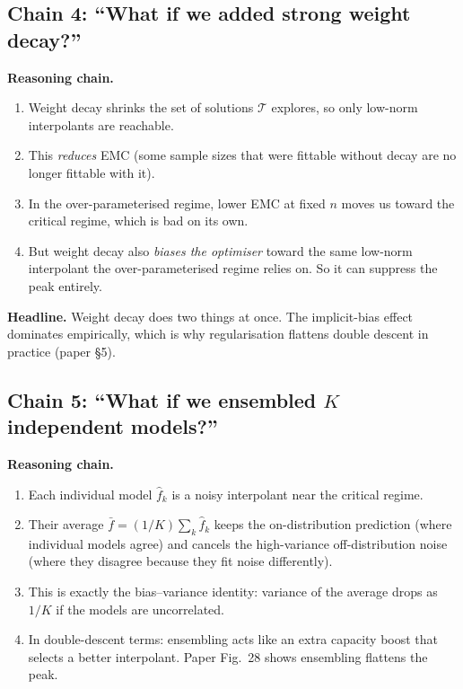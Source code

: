\documentclass[11pt,a4paper]{article}
\newcommand{\T}{\mathcal{T}}
\theoremstyle{definition}
\begin{document}
\subsection{Chain 4: ``What if we added strong weight decay?''}

\textbf{Reasoning chain.}
\begin{enumerate}[leftmargin=1.4em]
\item Weight decay shrinks the set of solutions $\T$ explores, so only low-norm interpolants are reachable.
\item This \emph{reduces} EMC (some sample sizes that were fittable without decay are no longer fittable with it).
\item In the over-parameterised regime, lower EMC at fixed $n$ moves us toward the critical regime, which is bad on its own.
\item But weight decay also \emph{biases the optimiser} toward the same low-norm interpolant the over-parameterised regime relies on. So it can suppress the peak entirely.
\end{enumerate}

\textbf{Headline.} Weight decay does two things at once. The implicit-bias effect dominates empirically, which is why regularisation flattens double descent in practice (paper \S5).

\subsection{Chain 5: ``What if we ensembled $K$ independent models?''}

\textbf{Reasoning chain.}
\begin{enumerate}[leftmargin=1.4em]
\item Each individual model $\hat f_k$ is a noisy interpolant near the critical regime.
\item Their average $\bar f = (1/K)\sum_k \hat f_k$ keeps the on-distribution prediction (where individual models agree) and cancels the high-variance off-distribution noise (where they disagree because they fit noise differently).
\item This is exactly the bias--variance identity: variance of the average drops as $1/K$ if the models are uncorrelated.
\item In double-descent terms: ensembling acts like an extra capacity boost that selects a better interpolant. Paper Fig.\ 28 shows ensembling flattens the peak.
\end{enumerate}
\end{document}
